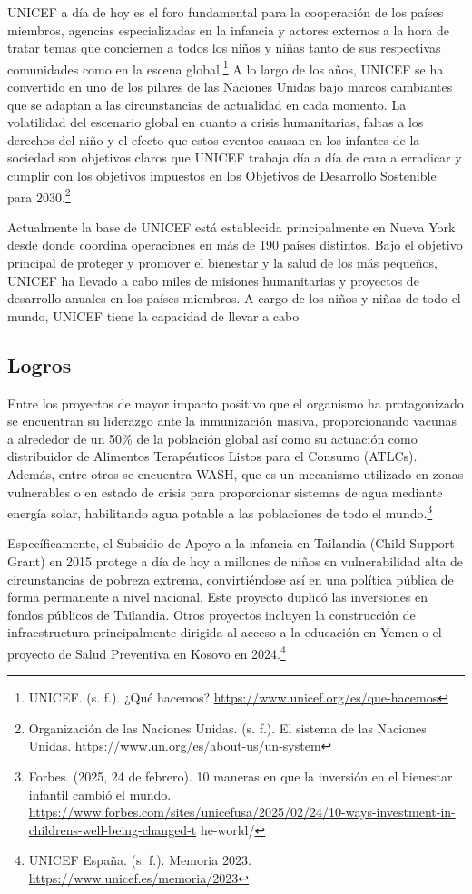 UNICEF a día de hoy es el foro fundamental para la cooperación de los países miembros, agencias especializadas en la infancia y actores externos a la hora de tratar temas que conciernen a todos los niños y niñas tanto de sus respectivas comunidades como en la escena global.\footnote{UNICEF. (s. f.). ¿Qué hacemos? \url{https://www.unicef.org/es/que-hacemos}} A lo largo de los años, UNICEF se ha convertido en uno de los pilares de las Naciones Unidas bajo marcos cambiantes que se adaptan a las circunstancias de actualidad en cada momento. La volatilidad del escenario global en cuanto a crisis humanitarias, faltas a los derechos del niño y el efecto que estos eventos causan en los infantes de la sociedad son objetivos claros que UNICEF trabaja día a día de cara a erradicar y cumplir con los objetivos impuestos en los Objetivos de Desarrollo Sostenible para 2030.\footnote{Organización de las Naciones Unidas. (s. f.). El sistema de las Naciones Unidas. \url{https://www.un.org/es/about-us/un-system}}

Actualmente la base de UNICEF está establecida principalmente en Nueva York desde donde coordina operaciones en más de 190 países distintos. Bajo el objetivo principal de proteger y promover el bienestar y la salud de los más pequeños, UNICEF ha llevado a cabo miles de misiones humanitarias y proyectos de desarrollo anuales en los países miembros. A cargo de los niños y niñas de todo el mundo, UNICEF tiene la capacidad de llevar a cabo

\subsection{Logros}

Entre los proyectos de mayor impacto positivo que el organismo ha protagonizado se encuentran su liderazgo ante la inmunización masiva, proporcionando vacunas a alrededor de un 50\% de la población global así como su actuación como distribuidor de Alimentos Terapéuticos Listos para el Consumo (ATLCs). Además, entre otros se encuentra WASH, que es un mecanismo utilizado en zonas vulnerables o en estado de crisis para proporcionar sistemas de agua mediante energía solar, habilitando agua potable a las poblaciones de todo el mundo.\footnote{Forbes. (2025, 24 de febrero). 10 maneras en que la inversión en el bienestar infantil cambió el mundo. \url{https://www.forbes.com/sites/unicefusa/2025/02/24/10-ways-investment-in-childrens-well-being-changed-t} he-world/}

Específicamente, el Subsidio de Apoyo a la infancia en Tailandia (Child Support Grant) en 2015 protege a día de hoy a millones de niños en vulnerabilidad alta de circunstancias de pobreza extrema, convirtiéndose así en una política pública de forma permanente a nivel nacional. Este proyecto duplicó las inversiones en fondos públicos de Tailandia. Otros proyectos incluyen la construcción de infraestructura principalmente dirigida al acceso a la educación en Yemen o el proyecto de Salud Preventiva en Kosovo en 2024.\footnote{UNICEF España. (s. f.). Memoria 2023. \url{https://www.unicef.es/memoria/2023}}

